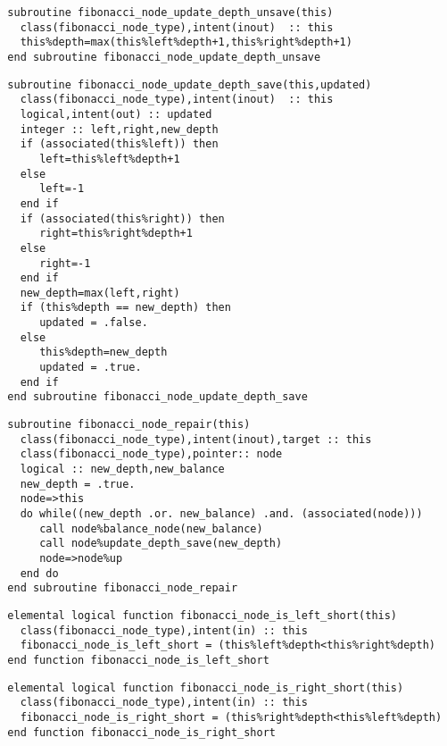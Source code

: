 \begin{Verbatim}
  subroutine fibonacci_node_update_depth_unsave(this)
    class(fibonacci_node_type),intent(inout)  :: this
    this%depth=max(this%left%depth+1,this%right%depth+1)
  end subroutine fibonacci_node_update_depth_unsave
\end{Verbatim}

\begin{Verbatim}
  subroutine fibonacci_node_update_depth_save(this,updated)
    class(fibonacci_node_type),intent(inout)  :: this
    logical,intent(out) :: updated
    integer :: left,right,new_depth
    if (associated(this%left)) then
       left=this%left%depth+1
    else
       left=-1
    end if
    if (associated(this%right)) then
       right=this%right%depth+1
    else
       right=-1
    end if
    new_depth=max(left,right)
    if (this%depth == new_depth) then
       updated = .false.
    else
       this%depth=new_depth
       updated = .true.
    end if
  end subroutine fibonacci_node_update_depth_save
\end{Verbatim}

\begin{Verbatim}
  subroutine fibonacci_node_repair(this)
    class(fibonacci_node_type),intent(inout),target :: this
    class(fibonacci_node_type),pointer:: node
    logical :: new_depth,new_balance
    new_depth = .true.
    node=>this
    do while((new_depth .or. new_balance) .and. (associated(node)))
       call node%balance_node(new_balance)
       call node%update_depth_save(new_depth)
       node=>node%up
    end do
  end subroutine fibonacci_node_repair
\end{Verbatim}

\begin{Verbatim}
  elemental logical function fibonacci_node_is_left_short(this)
    class(fibonacci_node_type),intent(in) :: this
    fibonacci_node_is_left_short = (this%left%depth<this%right%depth)
  end function fibonacci_node_is_left_short
\end{Verbatim}

\begin{Verbatim}
  elemental logical function fibonacci_node_is_right_short(this)
    class(fibonacci_node_type),intent(in) :: this
    fibonacci_node_is_right_short = (this%right%depth<this%left%depth)
  end function fibonacci_node_is_right_short
\end{Verbatim}

